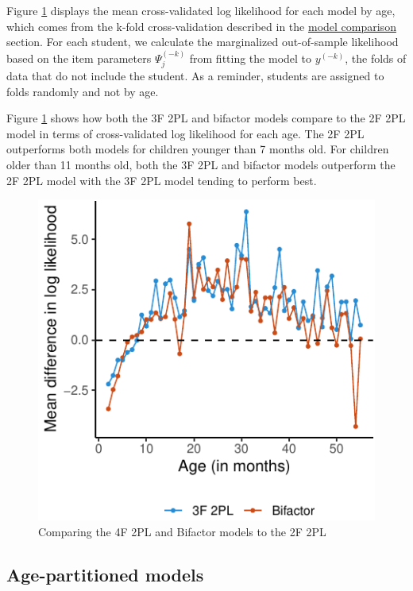 \documentclass[10pt, letterpaper]{article}
\newenvironment{CodeChunk}{}{}
\begin{document}
Figure \ref{fig:byage} displays the mean cross-validated log likelihood
for each model by age, which comes from the k-fold cross-validation
described in the \protect\hyperlink{modelcompare}{model comparison}
section. For each student, we calculate the marginalized out-of-sample
likelihood based on the item parameters \(\Psi_j^{(-k)}\) from fitting
the model to \(y^{(-k)}\), the folds of data that do not include the
student. As a reminder, students are assigned to folds randomly and not
by age.

Figure \ref{fig:byage} shows how both the 3F 2PL and bifactor models
compare to the 2F 2PL model in terms of cross-validated log likelihood
for each age. The 2F 2PL outperforms both models for children younger
than 7 months old. For children older than 11 months old, both the 3F
2PL and bifactor models outperform the 2F 2PL model with the 3F 2PL
model tending to perform best.

\begin{CodeChunk}
\begin{figure}[tb]
\includegraphics{figs/byage-1} \caption[Comparing the 4F 2PL and Bifactor models to the 2F 2PL]{Comparing the 4F 2PL and Bifactor models to the 2F 2PL}\label{fig:byage}
\end{figure}
\end{CodeChunk}

\hypertarget{age-partitioned-models}{%
\subsection{Age-partitioned models}\label{age-partitioned-models}}
\end{document}
